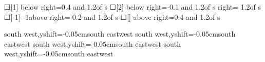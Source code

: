 \begin{scope}[new]
    {☐[1]}
    {}{below right=0.4 and 1.2of s}
    {☐[2]}
    {}{below right=-0.1 and 1.2of s}
    {}
    {}{right= 1.2of s}
    {☐[-1]}
    {-1}{above right=-0.2 and 1.2of s}
    {☐[]}
    {}{above right=0.4 and 1.2of s}

    {\shaftDefinitionSidePortIcon\shaftDefinitionDoorNumberPortIcon}
    {}{}{south west,yshift=-0.05cm}{south east}{west}
    {\shaftDefinitionSidePortIcon\shaftDefinitionDoorNumberPortIcon}
    {}{}{south west,yshift=-0.05cm}{south east}{west}
    {\shaftDefinitionSidePortIcon\shaftDefinitionDoorNumberPortIcon}
    {}{}{south west,yshift=-0.05cm}{south east}{west}
    {\shaftDefinitionSidePortIcon\shaftDefinitionDoorNumberPortIcon}
    {}{}{south west,yshift=-0.05cm}{south east}{west}
\end{scope}

